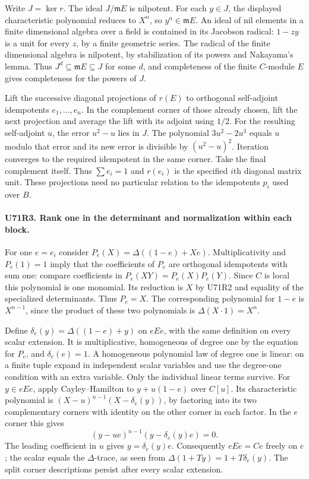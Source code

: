 Write $J=\ker r$. The ideal $J/\mathfrak m E$ is nilpotent.
For each $y\in J$, the displayed characteristic polynomial
reduces to $X^n$, so $y^n\in\mathfrak m E$. An ideal of nil
elements in a finite dimensional algebra over a field is contained
in its Jacobson radical: $1-zy$ is a unit for every $z$, by a
finite geometric series. The radical of the finite dimensional
algebra is nilpotent, by stabilization of its powers and Nakayama's
lemma. Thus $J^d\subseteq\mathfrak m E\subseteq J$ for some $d$,
and completeness of the finite $C$-module $E$ gives completeness
for the powers of $J$.

Lift the successive diagonal projections of $r(E)$ to orthogonal
self-adjoint idempotents $e_1,\ldots,e_n$. In the complement
corner of those already chosen, lift the next projection and
average the lift with its adjoint using $1/2$. For the resulting
self-adjoint $u$, the error $u^2-u$ lies in $J$. The polynomial
$3u^2-2u^3$ equals $u$ modulo that error and its new error is
divisible by $(u^2-u)^2$. Iteration converges to the required
idempotent in the same corner. Take the final complement itself.
Thus $\sum e_i=1$ and $r(e_i)$ is the specified $i$th diagonal
matrix unit. These projections need no particular relation to the
idempotents $p_i$ used over $B$.

\paragraph{U71R3. Rank one in the determinant and normalization within each block.}
For one $e=e_i$ consider
$P_e(X)=\Delta((1-e)+Xe)$. Multiplicativity and $P_e(1)=1$
imply that the coefficients of $P_e$ are orthogonal idempotents
with sum one: compare coefficients in $P_e(XY)=P_e(X)P_e(Y)$.
Since $C$ is local this polynomial is one monomial. Its reduction
is $X$ by U71R2 and equality of the specialized determinants.
Thus $P_e=X$. The corresponding polynomial for $1-e$ is
$X^{n-1}$, since the product of these two polynomials is
$\Delta(X\cdot1)=X^n$.

Define $\delta_e(y)=\Delta((1-e)+y)$ on $eEe$, with the same
definition on every scalar extension. It is multiplicative,
homogeneous of degree one by the equation for $P_e$, and
$\delta_e(e)=1$. A homogeneous polynomial law of degree one
is linear: on a finite tuple expand in independent scalar
variables and use the degree-one condition with an extra
variable. Only the individual linear terms survive. For $y\in
eEe$, apply Cayley--Hamilton to $y+u(1-e)$ over $C[u]$.
Its characteristic polynomial is
$(X-u)^{n-1}(X-\delta_e(y))$, by factoring into its two
complementary corners with identity on the other corner in
each factor. In the $e$ corner this gives
\[
 (y-ue)^{n-1}(y-\delta_e(y)e)=0.
\]
The leading coefficient in $u$ gives $y=\delta_e(y)e$.
Consequently $eEe=Ce$ freely on $e$; the scalar equals the
$\Delta$-trace, as seen from $\Delta(1+Ty)=1+T\delta_e(y)$.
The split corner descriptions persist after every scalar extension.

